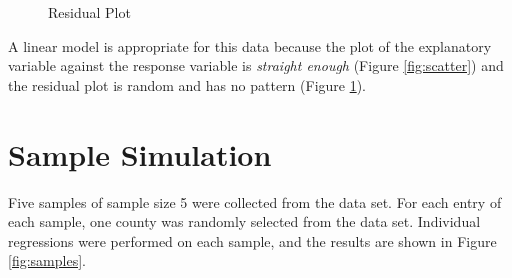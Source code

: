 \documentclass{article}
\begin{document}
\newpage

\begin{figure}[h]
        \centering
        \caption{Residual Plot}
        \label{fig:resid}
\end{figure}

A linear model is appropriate for this data because the plot of the
explanatory variable against the response variable is \textit{straight
enough} (Figure \ref{fig:scatter}) and the residual plot is random and
has no pattern (Figure \ref{fig:resid}).

\newpage

\section{Sample Simulation}

Five samples of sample size 5 were collected from the data set. For each entry
of each sample, one county was randomly selected from the data set. Individual
regressions were performed on each sample, and the results are shown in Figure
\ref{fig:samples}.
\end{document}
